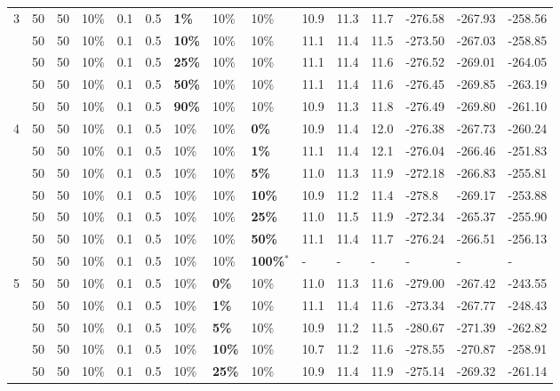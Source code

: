 \begin{table}
\begin{tabular}{|l|l|l|l|l|l|l|l|l||l|l|l|l|l|l|}
    \hline
    3 & 50 & 50 & 10\% & 0.1 & 0.5 & \textbf{1\%} & 10\% & 10\% & 10.9 & 11.3 & 11.7 & -276.58 & -267.93 & -258.56 \\
    ~ & 50 & 50 & 10\% & 0.1 & 0.5 & \textbf{10\%} & 10\% & 10\% & 11.1 & 11.4 & 11.5 & -273.50 & -267.03 & -258.85 \\
    ~ & 50 & 50 & 10\% & 0.1 & 0.5 & \textbf{25\%} & 10\% & 10\% & 11.1 & 11.4 & 11.6 & -276.52 & -269.01 & -264.05 \\
    ~ & 50 & 50 & 10\% & 0.1 & 0.5 & \textbf{50\%} & 10\% & 10\% & 11.1 & 11.4 & 11.6 & -276.45 & -269.85 & -263.19 \\
    ~ & 50 & 50 & 10\% & 0.1 & 0.5 & \textbf{90\%} & 10\% & 10\% & 10.9 & 11.3 & 11.8 & -276.49 & -269.80 & -261.10 \\
    \hline
    4 & 50 & 50 & 10\% & 0.1 & 0.5 & 10\% & 10\% & \textbf{0\%} & 10.9 & 11.4 & 12.0 & -276.38 & -267.73 & -260.24 \\
    ~ & 50 & 50 & 10\% & 0.1 & 0.5 & 10\% & 10\% & \textbf{1\%} & 11.1 & 11.4 & 12.1 & -276.04 & -266.46 & -251.83 \\
    ~ & 50 & 50 & 10\% & 0.1 & 0.5 & 10\% & 10\% & \textbf{5\%} & 11.0 & 11.3 & 11.9 & -272.18 & -266.83 & -255.81 \\
    ~ & 50 & 50 & 10\% & 0.1 & 0.5 & 10\% & 10\% & \textbf{10\%} & 10.9 & 11.2 & 11.4 & -278.8 & -269.17 & -253.88 \\
    ~ & 50 & 50 & 10\% & 0.1 & 0.5 & 10\% & 10\% & \textbf{25\%} & 11.0 & 11.5 & 11.9 & -272.34 & -265.37 & -255.90 \\
    ~ & 50 & 50 & 10\% & 0.1 & 0.5 & 10\% & 10\% & \textbf{50\%} & 11.1 & 11.4 & 11.7 & -276.24 & -266.51 & -256.13 \\
    ~ & 50 & 50 & 10\% & 0.1 & 0.5 & 10\% & 10\% & \textbf{100\%$^*$} & - & - & - & - & - & - \\
    \hline
    5 & 50 & 50 & 10\% & 0.1 & 0.5 & 10\% & \textbf{0\%} & 10\% & 11.0 & 11.3 & 11.6 & -279.00 & -267.42 & -243.55 \\
    ~ & 50 & 50 & 10\% & 0.1 & 0.5 & 10\% & \textbf{1\%} & 10\% & 11.1 & 11.4 & 11.6 & -273.34 & -267.77 & -248.43 \\
    ~ & 50 & 50 & 10\% & 0.1 & 0.5 & 10\% & \textbf{5\%} & 10\% & 10.9 & 11.2 & 11.5 & -280.67 & -271.39 & -262.82\\
    ~ & 50 & 50 & 10\% & 0.1 & 0.5 & 10\% & \textbf{10\%} & 10\% & 10.7 & 11.2 & 11.6 & -278.55 & -270.87 & -258.91 \\
    ~ & 50 & 50 & 10\% & 0.1 & 0.5 & 10\% & \textbf{25\%} & 10\% & 10.9 & 11.4 & 11.9 & -275.14 & -269.32 & -261.14 \\

\end{tabular}
\end{table}
